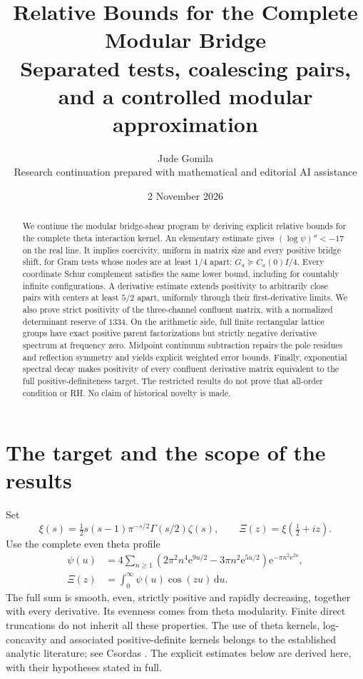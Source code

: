 \documentclass[11pt,letterpaper]{article}
\title{\textbf{Relative Bounds for the Complete Modular Bridge}\\[0.45em]
\large Separated tests, coalescing pairs, and a controlled modular approximation}
\author{Jude Gomila\\\small Research continuation prepared with mathematical and editorial AI assistance}
\date{2 November 2026}
\numberwithin{equation}{section}
\theoremstyle{remark}\newtheorem{remark}[theorem]{Remark}
\newcommand{\dd}{\,\mathrm d}
\newcommand{\ee}{\mathrm e}
\begin{document}
\maketitle
\begin{abstract}
We continue the modular bridge-shear program by deriving explicit relative bounds for the complete theta interaction kernel. An elementary estimate gives $(\log\psi)''<-17$ on the real line. It implies coercivity, uniform in matrix size and every positive bridge shift, for Gram tests whose nodes are at least $1/4$ apart: $G_a\succeq C_a(0)I/4$. Every coordinate Schur complement satisfies the same lower bound, including for countably infinite configurations. A derivative estimate extends positivity to arbitrarily close pairs with centers at least $5/2$ apart, uniformly through their first-derivative limits. We also prove strict positivity of the three-channel confluent matrix, with a normalized determinant reserve of $1334$. On the arithmetic side, full finite rectangular lattice groups have exact positive parent factorizations but strictly negative derivative spectrum at frequency zero. Midpoint continuum subtraction repairs the pole residues and reflection symmetry and yields explicit weighted error bounds. Finally, exponential spectral decay makes positivity of every confluent derivative matrix equivalent to the full positive-definiteness target. The restricted results do not prove that all-order condition or RH. No claim of historical novelty is made.
\end{abstract}

\section{The target and the scope of the results}
Set
\begin{equation}
\xi(s)=\tfrac12s(s-1)\pi^{-s/2}\Gamma(s/2)\zeta(s),
\qquad \Xi(z)=\xi(\tfrac12+iz).
\end{equation}
Use the complete even theta profile
\begin{align}
\psi(u)&=4\sum_{n\ge1}
\left(2\pi^2n^4\ee^{9u/2}-3\pi n^2\ee^{5u/2}\right)
\ee^{-\pi n^2\ee^{2u}},\label{eq:psi}\\
\Xi(z)&=\int_0^\infty\psi(u)\cos(zu)\dd u.
\end{align}
The full sum is smooth, even, strictly positive and rapidly decreasing, together with every derivative. Its evenness comes from theta modularity. Finite direct truncations do not inherit all these properties. The use of theta kernels, log-concavity and associated positive-definite kernels belongs to the established analytic literature; see Csordas \cite{csordas}. The explicit estimates below are derived here, with their hypotheses stated in full.
\end{document}
